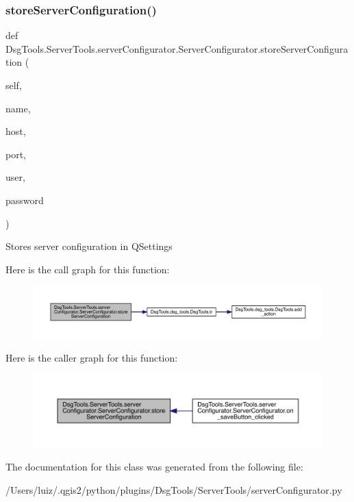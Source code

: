 \subsubsection{\texorpdfstring{store\+Server\+Configuration()}{storeServerConfiguration()}}
{\footnotesize\ttfamily def Dsg\+Tools.\+Server\+Tools.\+server\+Configurator.\+Server\+Configurator.\+store\+Server\+Configuration (\begin{DoxyParamCaption}\item[{}]{self,  }\item[{}]{name,  }\item[{}]{host,  }\item[{}]{port,  }\item[{}]{user,  }\item[{}]{password }\end{DoxyParamCaption})}

\begin{DoxyVerb}Stores server configuration in QSettings
\end{DoxyVerb}
 Here is the call graph for this function\+:
\nopagebreak
\begin{figure}[H]
\begin{center}
\leavevmode
\includegraphics[width=350pt]{class_dsg_tools_1_1_server_tools_1_1server_configurator_1_1_server_configurator_a1f69ad61cf3d2fe52ffd2b06f29ea5e5_cgraph}
\end{center}
\end{figure}
Here is the caller graph for this function\+:
\nopagebreak
\begin{figure}[H]
\begin{center}
\leavevmode
\includegraphics[width=350pt]{class_dsg_tools_1_1_server_tools_1_1server_configurator_1_1_server_configurator_a1f69ad61cf3d2fe52ffd2b06f29ea5e5_icgraph}
\end{center}
\end{figure}


The documentation for this class was generated from the following file\+:\begin{DoxyCompactItemize}
\item 
/\+Users/luiz/.\+qgis2/python/plugins/\+Dsg\+Tools/\+Server\+Tools/server\+Configurator.\+py\end{DoxyCompactItemize}
